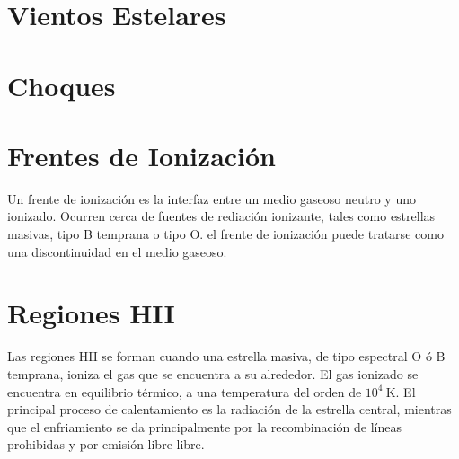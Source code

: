 \section{Vientos Estelares}
\section{Choques}
\section{Frentes de Ionización}
Un frente de ionización es la interfaz entre un medio gaseoso neutro y uno
ionizado. Ocurren cerca de fuentes de rediación ionizante, tales como
estrellas masivas, tipo B temprana o tipo O. el frente de ionización puede
tratarse como una discontinuidad en el medio gaseoso.

\section{Regiones HII}
\label{sec:HII}
Las regiones HII se forman cuando una estrella masiva, de tipo espectral
O ó B temprana, ioniza el gas que se encuentra a su alrededor. El gas
ionizado se encuentra en equilibrio térmico, a una temperatura del
orden de $10^4~\mathrm{K}$. El principal proceso de calentamiento es la
radiación de la estrella central, mientras que el enfriamiento se da
principalmente por la recombinación de líneas prohibidas y por emisión
libre-libre.

